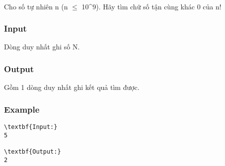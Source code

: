 

 

Cho số tự nhiên n (n  $\le$  10\textasciicircum9). Hãy tìm chữ số tận cùng khác 0 của n!

\subsubsection{Input}

Dòng duy nhất ghi số N.

\subsubsection{Output}

Gồm 1 dòng duy nhất ghi kết quả tìm được.

\subsubsection{Example}
\begin{verbatim}
\textbf{Input:}
5

\textbf{Output:}
2
\end{verbatim}
